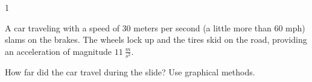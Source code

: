 
\AddToShipoutPicture*{\BackgroundPic}

\addtocounter {ProbNum} {1}

 
{\bf \Large{}} A car traveling with a speed of 30 meters per second (a little more than 60 mph) slams on the brakes.  The wheels lock up and the tires skid on the road, providing an acceleration of magnitude ${11~\tfrac{m}{s^2}}$.   \bigskip

How far did the car travel during the slide? Use graphical methods.\paragraph{}
\noindent
\vfill




\newpage